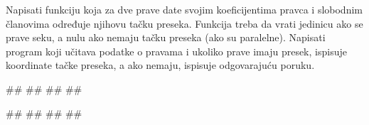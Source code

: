  
\begin{Exercise}[label=POK_03] 
Napisati funkciju  
koja za dve prave date svojim koeficijentima
pravca i slobodnim članovima određuje njihovu tačku preseka. 
Funkcija treba da vrati jedinicu ako se prave seku, a nulu ako nemaju
tačku preseka (ako su paralelne). Napisati program
koji učitava podatke o pravama i ukoliko prave imaju presek, ispisuje
koordinate tačke preseka, a ako nemaju, ispisuje odgovarajuću poruku.
   
\begin{miditest}
\begin{upotreba}{1}
#\naslovInt#
##
##
##
\end{upotreba}
\end{miditest}
\begin{miditest}
\begin{upotreba}{2}
#\naslovInt#
##
##
##
\end{upotreba}
\end{miditest}

\end{Exercise}
\ifresenja
\begin{Answer}[ref=POK_03]
\end{Answer}
 \fi

